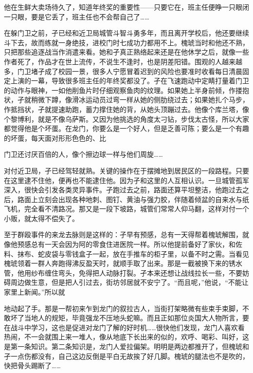 \documentclass{article}
\begin{document}
\newpage 

他在生鲜大卖场待久了，知道年终奖的重要性——只要它在，班主任便睁一只眼闭一只眼，要是它丢了，班主任也不会帮自己了……

在躲门卫之前，孑已经和近卫局城管斗智斗勇多年，而且离开学校后，他还要继续斗下去，故而练就一身绝技，进校门时七成功力都用不上。槐琥当时和他还不熟，只把那些追逐战当作消遣来看。她和孑真正熟络起来还是在他休学之后，就像一些作者死了，作品才在世上流传，不说生不逢时，也是阴差阳错。围观的人越来越多，门卫堵孑成了校园一景，很多人宁愿冒着迟到的风险也要准时收看每日清晨固定上演的一幕，导致很多班主任的年终奖都没了。孑在飞速跑动中定睛打量着门卫的动作与眼神，一如他削鱼片时仔细观察鱼肉的纹理。如果她上半身前倾，作搂抱状，孑就稍微下蹲，像滑冰运动员过弯一样从她的侧肋绕过去；如果她扎个马步，作抵挡状，孑就提速助跑，蓄力撑住她的背，从她头顶蹦过去。他像个库兰塔，像个黎博利，就是不像乌萨斯。又因为他挑选的角度太刁钻，步伐太古怪，所以大家都觉得他是个坏蛋。在龙门，你要么是一个好人，但是乏善可陈；要么是一个有趣的坏蛋，每天面对形形色色的、比

\newpage 

门卫还讨厌百倍的人，像个擦边球一样与他们周旋……

对付近卫局，孑已经驾轻就熟。关键的操作在于摆摊地到居民区的一段路程。只要在这里逮不住他，便再也不能逮住他。因为孑和这里的人互相认识。一旦城管孤军深入，很快会引发各类灵异事件。孑跑过去之前，路面还算平坦整洁，他跑过去之后，路面上立刻会出现各种地刺、图钉、黄油与强力胶，伴随着倾盆的自来水与纸飞机，完全看不清路况。那又是一段下坡路，城管们常常人仰马翻，这样对付一个小贩，就太得不偿失了。

至于群殴事件的来龙去脉则是这样的：孑早有预感，总有一天得帮着槐琥解围，就像他预感总有一天会因为阿的零食住进医院一样。所以他提前备好了家伙，和佐料、抹布、蛇皮袋与零钱盒子一起，放在手推车的柜子里，以备不时之需。当看见槐琥领着一群人奔跑得沸反盈天时，就顺手取了出来。那是一截被换下来的锈水管，他用纱布缠住弯头，免得把人动脉打裂。孑本来还想让战线拉长一些，不要妨碍周边做生意，但是把人引过去，街坊邻居就不安宁了。“而且呢，”他说，“不能让家里上新闻。”所以就

\newpage 

地动起了手。那是一帮初来乍到龙门的叙拉古人，当街打架略微有些束手束脚，不敢坏了当地人的规矩，毕竟强龙不压地头蛇嘛。而且正如那位炎国大人物所言，要在战斗中学习，这也是促进对龙门了解的好时机……很快他们发现，龙门人喜欢看热闹，不一会就围上来一堆人，像从地底下长出来的似的，欢呼、喝彩、叫好，这是第一条知识。第二条知识是，龙门人爱拉偏架。明明是两边都推开了，但槐琥和孑一点伤都没有，自己这边反倒是平白无故挨了好几脚。槐琥的腿法也不是吹的，快把骨头踢断了……
\end{document}
